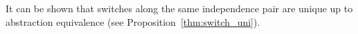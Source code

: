 \documentclass[a4paper,UKenglish,cleveref,pdftex, thm-restate,numberwithinsect,anonymous]{lipics}
\def\G{\textbf {\textup{G}}}
\newcommand{\dder}[1]{\mathscr{#1}}
\newcommand{\der}[1]{\underline{\dder{#1}}}
\begin{document}
\begin{definition}[Switch]

\end{definition}

It can be shown that switches along the same independence pair are unique up to abstraction
equivalence (see Proposition~\ref{thm:switch_uni}).
\end{document}
